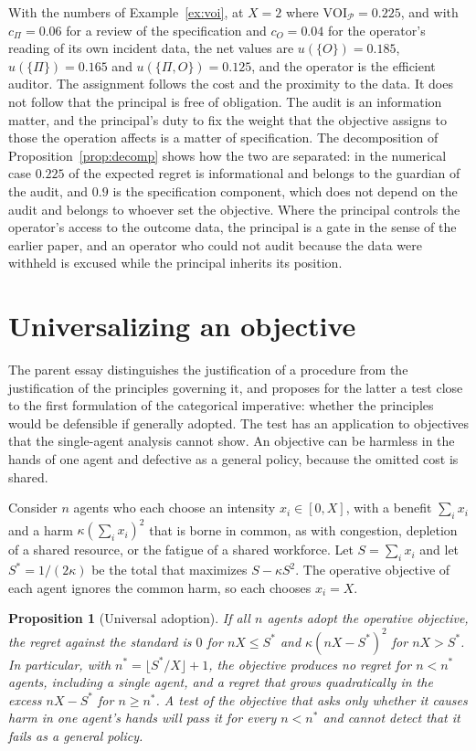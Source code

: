 \documentclass[11pt]{article}
\newcommand{\VOI}{\mathrm{VOI}}
\theoremstyle{plain}
\newtheorem{proposition}{Proposition}
\theoremstyle{definition}
\begin{document}
With the numbers of Example~\ref{ex:voi}, at $X=2$ where $\VOI_{\mathcal P}=0.225$, and with $c_\Pi=0.06$ for a review of the specification and $c_O=0.04$ for the operator's reading of its own incident data, the net values are $u(\{O\})=0.185$, $u(\{\Pi\})=0.165$ and $u(\{\Pi,O\})=0.125$, and the operator is the efficient auditor. The assignment follows the cost and the proximity to the data. It does not follow that the principal is free of obligation. The audit is an information matter, and the principal's duty to fix the weight that the objective assigns to those the operation affects is a matter of specification. The decomposition of Proposition~\ref{prop:decomp} shows how the two are separated: in the numerical case $0.225$ of the expected regret is informational and belongs to the guardian of the audit, and $0.9$ is the specification component, which does not depend on the audit and belongs to whoever set the objective. Where the principal controls the operator's access to the outcome data, the principal is a gate in the sense of the earlier paper, and an operator who could not audit because the data were withheld is excused while the principal inherits its position.

\section{Universalizing an objective}\label{sec:universal}

The parent essay distinguishes the justification of a procedure from the justification of the principles governing it, and proposes for the latter a test close to the first formulation of the categorical imperative: whether the principles would be defensible if generally adopted. The test has an application to objectives that the single-agent analysis cannot show. An objective can be harmless in the hands of one agent and defective as a general policy, because the omitted cost is shared.

Consider $n$ agents who each choose an intensity $x_i\in[0,X]$, with a benefit $\sum_ix_i$ and a harm $\kappa(\sum_ix_i)^2$ that is borne in common, as with congestion, depletion of a shared resource, or the fatigue of a shared workforce. Let $S=\sum_ix_i$ and let $S^*=1/(2\kappa)$ be the total that maximizes $S-\kappa S^2$. The operative objective of each agent ignores the common harm, so each chooses $x_i=X$.

\begin{proposition}[Universal adoption]\label{prop:universal}
If all $n$ agents adopt the operative objective, the regret against the standard is $0$ for $nX\le S^*$ and $\kappa(nX-S^*)^2$ for $nX>S^*$. In particular, with $n^*=\lfloor S^*/X\rfloor+1$, the objective produces no regret for $n<n^*$ agents, including a single agent, and a regret that grows quadratically in the excess $nX-S^*$ for $n\ge n^*$. A test of the objective that asks only whether it causes harm in one agent's hands will pass it for every $n<n^*$ and cannot detect that it fails as a general policy.
\end{proposition}
\end{document}
